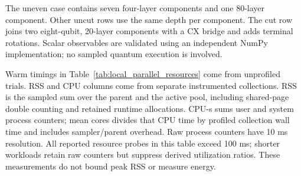 The uneven case contains seven four-layer components and one 80-layer component. Other uncut
rows use the same depth per component. The cut row joins two eight-qubit, 20-layer components
with a CX bridge and adds terminal rotations. Scalar observables are validated using an
independent NumPy implementation; no sampled quantum execution is involved.

Warm timings in Table~\ref{tab:local_parallel_resources} come from unprofiled trials. RSS and
CPU columns come from separate instrumented collections. RSS is the sampled sum over the parent
and the active pool, including shared-page double counting and retained runtime allocations.
CPU-s sums user and system process counters; mean cores divides that CPU time by profiled
collection wall time and includes sampler/parent overhead. Raw process counters have 10 ms
resolution. All reported resource probes in this table exceed 100 ms; shorter workloads retain
raw counters but suppress derived utilization ratios. These measurements do not bound peak RSS
or measure energy.
